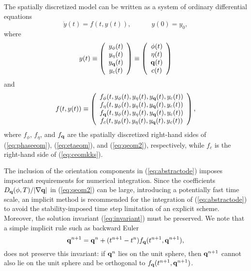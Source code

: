 The spatially discretized model can be written as a system of ordinary
differential equations
%
\begin{equation}
  \dot{y}(t) = f(t,y(t)), \hspace{3em} y(0) = y_0,
\label{eq:abstractode}
\end{equation}
%
where
%
\begin{equation}
  y(t) \equiv \left (
    \begin{array}{c}
      y_{\phi}(t) \\ y_\eta(t) \\ y_{\bf q}(t) \\ y_c(t)
    \end{array}
  \right ) \equiv \left (
    \begin{array}{c}
      \phi(t) \\ \eta(t) \\ {\bf q}(t) \\ c(t)
    \end{array}
  \right )
\end{equation}
%
and
%
\begin{equation}
  f(t,y(t)) \equiv \left (
    \begin{array}{c}
      f_{\phi}(t,y_{\phi}(t),y_\eta(t),y_{\bf q}(t),y_c(t)) \\
      f_{\eta}(t,y_{\phi}(t),y_\eta(t),y_{\bf q}(t),y_c(t)) \\
      f_{\bf q}(t,y_{\phi}(t),y_\eta(t),y_{\bf q}(t),y_c(t)) \\
      f_c(t,y_{\phi}(t),y_\eta(t),y_{\bf q}(t),y_c(t))
    \end{array}
  \right ),
\end{equation}
%
where $f_{\phi}$, $f_\eta$, and $f_{\bf q}$ are the spatially
discretized right-hand sides of (\ref{eq:phaseeom}),
(\ref{eq:etaeom}), and (\ref{eq:qeom2}), respectively, while $f_c$ is
the right-hand side of (\ref{eq:ceomkks}).

The inclusion of the orientation components in (\ref{eq:abstractode})
imposes important requirements for numerical integration.  Since the
coefficients $ D_{\bf q}(\phi,T) / |\nabla {\bf q} |$ in (\ref{eq:qeom2}) can be
large, introducing a potentially fast time scale, an implicit method
is recommended for the integration of (\ref{eq:abstractode}) to avoid the
stability-imposed time step limitation of an explicit scheme.
Moreover, the solution invariant (\ref{eq:invariant}) must be preserved.
We note that a simple implicit rule such as backward Euler
%
\begin{equation}
  {\bf q}^{n+1} = {\bf q}^n + (t^{n+1} - t^n) f_{\bf q}(t^{n+1},{\bf q}^{n+1}),
\end{equation}
%
does not preserve this invariant: if ${\bf q}^n$ lies on the unit
sphere, then ${\bf q}^{n+1}$ cannot also lie on the unit sphere and be
orthogonal to $f_{\bf q}(t^{n+1},{\bf q}^{n+1})$.

